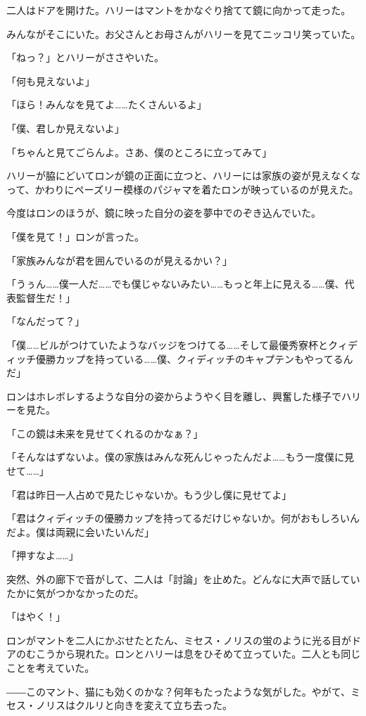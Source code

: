 \documentclass[10pt,a4paper]{article}
\begin{document}
\begin{CJK}{UTF8}{min}
二人はドアを開けた。ハリーはマントをかなぐり捨てて鏡に向かって走った。

みんながそこにいた。お父さんとお母さんがハリーを見てニッコリ笑っていた。

「ねっ？」とハリーがささやいた。

「何も見えないよ」

「ほら！みんなを見てよ……たくさんいるよ」

「僕、君しか見えないよ」

「ちゃんと見てごらんよ。さあ、僕のところに立ってみて」

ハリーが脇にどいてロンが鏡の正面に立つと、ハリーには家族の姿が見えなくなって、かわりにペーズリー模様のパジャマを着たロンが映っているのが見えた。

今度はロンのほうが、鏡に映った自分の姿を夢中でのぞき込んでいた。

「僕を見て！」ロンが言った。

「家族みんなが君を囲んでいるのが見えるかい？」

「うぅん……僕一人だ……でも僕じゃないみたい……もっと年上に見える……僕、代表監督生だ！」

「なんだって？」

「僕……ビルがつけていたようなバッジをつけてる……そして最優秀寮杯とクィディッチ優勝カップを持っている……僕、クィディッチのキャプテンもやってるんだ」

ロンはホレボレするような自分の姿からようやく目を離し、興奮した様子でハリーを見た。

「この鏡は未来を見せてくれるのかなぁ？」

「そんなはずないよ。僕の家族はみんな死んじゃったんだよ……もう一度僕に見せて……」

「君は昨日一人占めで見たじゃないか。もう少し僕に見せてよ」

「君はクィディッチの優勝カップを持ってるだけじゃないか。何がおもしろいんだよ。僕は両親に会いたいんだ」

「押すなよ……」

突然、外の廊下で音がして、二人は「討論」を止めた。どんなに大声で話していたかに気がつかなかったのだ。

「はやく！」

ロンがマントを二人にかぶせたとたん、ミセス・ノリスの蛍のように光る目がドアのむこうから現れた。ロンとハリーは息をひそめて立っていた。二人とも同じことを考えていた。

――このマント、猫にも効くのかな？何年もたったような気がした。やがて、ミセス・ノリスはクルリと向きを変えて立ち去った。


\end{CJK}
\end{document}
